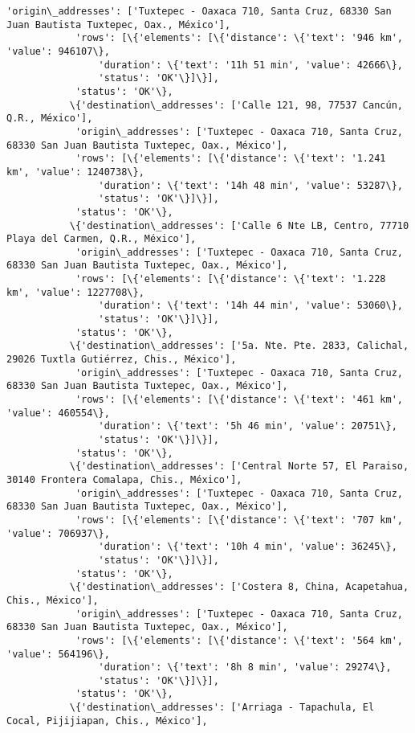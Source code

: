 \documentclass[11pt]{article}
\begin{document}
\begin{Verbatim}[commandchars=\\\{\}]
            'origin\_addresses': ['Tuxtepec - Oaxaca 710, Santa Cruz, 68330 San Juan Bautista Tuxtepec, Oax., México'],
            'rows': [\{'elements': [\{'distance': \{'text': '946 km', 'value': 946107\},
                'duration': \{'text': '11h 51 min', 'value': 42666\},
                'status': 'OK'\}]\}],
            'status': 'OK'\},
           \{'destination\_addresses': ['Calle 121, 98, 77537 Cancún, Q.R., México'],
            'origin\_addresses': ['Tuxtepec - Oaxaca 710, Santa Cruz, 68330 San Juan Bautista Tuxtepec, Oax., México'],
            'rows': [\{'elements': [\{'distance': \{'text': '1.241 km', 'value': 1240738\},
                'duration': \{'text': '14h 48 min', 'value': 53287\},
                'status': 'OK'\}]\}],
            'status': 'OK'\},
           \{'destination\_addresses': ['Calle 6 Nte LB, Centro, 77710 Playa del Carmen, Q.R., México'],
            'origin\_addresses': ['Tuxtepec - Oaxaca 710, Santa Cruz, 68330 San Juan Bautista Tuxtepec, Oax., México'],
            'rows': [\{'elements': [\{'distance': \{'text': '1.228 km', 'value': 1227708\},
                'duration': \{'text': '14h 44 min', 'value': 53060\},
                'status': 'OK'\}]\}],
            'status': 'OK'\},
           \{'destination\_addresses': ['5a. Nte. Pte. 2833, Calichal, 29026 Tuxtla Gutiérrez, Chis., México'],
            'origin\_addresses': ['Tuxtepec - Oaxaca 710, Santa Cruz, 68330 San Juan Bautista Tuxtepec, Oax., México'],
            'rows': [\{'elements': [\{'distance': \{'text': '461 km', 'value': 460554\},
                'duration': \{'text': '5h 46 min', 'value': 20751\},
                'status': 'OK'\}]\}],
            'status': 'OK'\},
           \{'destination\_addresses': ['Central Norte 57, El Paraiso, 30140 Frontera Comalapa, Chis., México'],
            'origin\_addresses': ['Tuxtepec - Oaxaca 710, Santa Cruz, 68330 San Juan Bautista Tuxtepec, Oax., México'],
            'rows': [\{'elements': [\{'distance': \{'text': '707 km', 'value': 706937\},
                'duration': \{'text': '10h 4 min', 'value': 36245\},
                'status': 'OK'\}]\}],
            'status': 'OK'\},
           \{'destination\_addresses': ['Costera 8, China, Acapetahua, Chis., México'],
            'origin\_addresses': ['Tuxtepec - Oaxaca 710, Santa Cruz, 68330 San Juan Bautista Tuxtepec, Oax., México'],
            'rows': [\{'elements': [\{'distance': \{'text': '564 km', 'value': 564196\},
                'duration': \{'text': '8h 8 min', 'value': 29274\},
                'status': 'OK'\}]\}],
            'status': 'OK'\},
           \{'destination\_addresses': ['Arriaga - Tapachula, El Cocal, Pijijiapan, Chis., México'],

\end{Verbatim}
\end{document}
